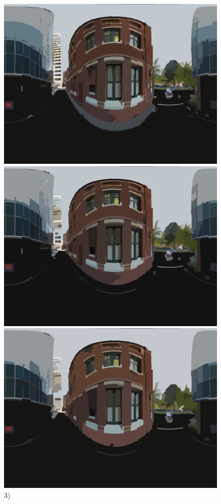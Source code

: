 \documentclass[final,3p,times,authoryear]{elsarticle}
\begin{document}
\begin{figure}
\textbf{}\includegraphics[scale=0.08]{Images/mean/0070_7_6_100.png} 
\textbf{}\includegraphics[scale=0.08]{Images/mean/0070_5_7_210.png} 
\textbf{}\includegraphics[scale=0.08]{Images/mean/0070_7_8_300.png} 3)

\end{figure}
\end{document}
